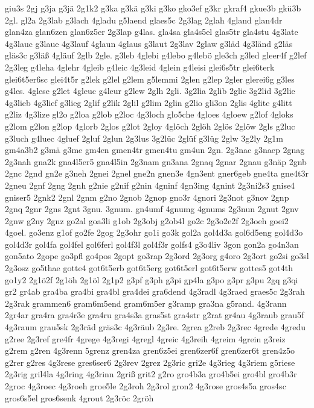 {giu3s
2gj
g3ja
g3jä
2g1k2
g3ka
g3kä
g3ki
g3ko
gko3ef
g3kr
gkraf4
gkue3b
gkü3b
2gl.
gl2a
2g3lab
g3lach
4gladu
g5laend
glaes5c
2g3lag
2glah
4gland
glan4dr
glan4za
glan6zen
glan6z5er
2g3lap
g4las.
gla4sa
gla4s5el
glas5tr
gla4stu
4g3late
4g3lauc
g3laue
4g3lauf
4glaun
4glaus
g3laut
2g3lav
2glaw
g3läd
4g3länd
g2läs
gläs3c
g3läß
4gläuf
2glb
2gle.
g3leb
4glebi
g4lebo
g4lebö
gle3ch
g3led
gleer4f
g2lef
2g3leg
g4leha
4glehr
4gleib
g4leic
4g3leid
4glein
g4leisi
glei6s5tr
glei6terk
glei6t5er6sc
glei4t5r
g2lek
g2lel
g2lem
g5lemmi
2glen
g2lep
2gler
glerei6g
g3les
g4les.
4glese
g2let
4gleuc
g4leur
g2lew
2glh
2gli.
3g2lia
2glib
2glic
3g2lid
3g2lie
4g3lieb
4g3lief
g3lieg
2glif
g2lik
2glil
g2lim
2glin
g2lio
gli3on
2glis
4glite
g4litt
g2liz
4g3lize
gl2o
g2loa
g2lob
g2loc
4g3loch
glo5che
4gloes
4gloew
g2lof
4gloks
g2lom
g2lon
g2lop
4glorb
2glos
g2lot
2gloy
4glöch
2glöh
2glös
2glöw
2gls
g2luc
g3luch
g4luec
4gluef
2gluf
2glun
2g3lus
3g2lüc
2glüf
g3lüg
2glw
3g2ly
2g1m
gm4a3b2
g3mä
g3me
gm4en
gmen4tr
gmen4tu
gm4un
2gn.
2g3nac
g3naep
2gnag
2g3nah
gna2k
gna4l5er5
gna4l5in
2g3nam
gn3ana
2gnaq
2gnar
2gnau
g3näp
2gnb
2gnc
2gnd
gn2e
g3neh
2gnei
2gnel
gne2n
gnen3e
4gn3ent
gner6geb
gne4ta
gne4t3r
2gneu
2gnf
2gng
2gnh
g2nie
g2nif
g2nin
4gninf
4gn3ing
4gnint
2g3ni2s3
gnise4
gniser5
2gnk2
2gnl
2gnm
g2no
2gnob
2gnop
gno3r
4gnori
2g3not
g3nov
2gnp
2gnq
2gnr
2gns
2gnt
3gnu.
3gnum.
gn4umf
4gnumg
4gnums
2g3nun
2gnut
2gnv
2gnw
g2ny
2gnz
go2al
goa3li
g1ob
2g3obj
g2ob4l
go2c
2g3o2e2f
2g3oeh
goei2
4goel.
go3enz
g1of
go2fe
2gog
2g3ohr
go1i
go3k
gol2a
gol4d3a
gol6d5eng
gol4d3o
gol4d3r
gol4fa
gol4fel
gol6ferl
gol4f3l
gol4f3r
golfs4
g3o4liv
3gon
gon2a
go4n3an
gon5ato
2gope
go3pfl
go4pos
2gopt
go3rap
2g3ord
2g3org
g4oro
2g3ort
go2si
go3sl
2g3osz
go5thae
gotte4
got6t5erb
got6t5erg
got6t5erl
got6t5erw
gottes5
got4th
go1y2
2g1ö2f
2g1öh
2g1öl
2g1p2
g3pf
g3ph
g3pi
gp4la
g3po
g3pr
g3pu
2gq
g3qi
gr2
gr4ab
gra4ba
gra4bi
gra4bl
gra4dei
gra6dend
4g3radl
4g3raed
graes5c
2g3rah
2g3rak
grammen6
gram6m5end
gram6m5er
g3ramp
gra3na
g5rand.
4g3rann
2gr4ar
gra4ra
gra4r3e
gra4ru
gra4s3a
gras5st
gra4str
g2rat
gr4au
4g3raub
grau5f
4g3raum
grau5sk
2g3räd
gräs3c
4g3räub
2g3re.
2grea
g2reb
2g3rec
4grede
4gredu
g2ree
2g3ref
gre4fr
4grege
4g3regi
4gregl
4greic
4g3reih
4greim
4grein
g3reiz
g2rem
g2ren
4g3renn
5grenz
gren4za
gren6z5ei
gren6zer6f
gren6zer6t
gren4z5o
g2rer
g2res
4g3rese
gres6ser6
2g3rev
2grez
2g3ric
gri2e
4g3rieg
4g3riem
g5riese
2g3rig
gril4la
4g3ring
4g3rinn
2griß
grit2
g2ro
gro4b3a
gro4b5ei
gro4bl
gro4b3r
2groc
4g3roec
4g3roeh
groe5le
2g3roh
2g3rol
gron2
4g3rose
gros4s5a
gros4sc
gros6s5el
gros6senk
4grout
2g3röc
2gröh
}
